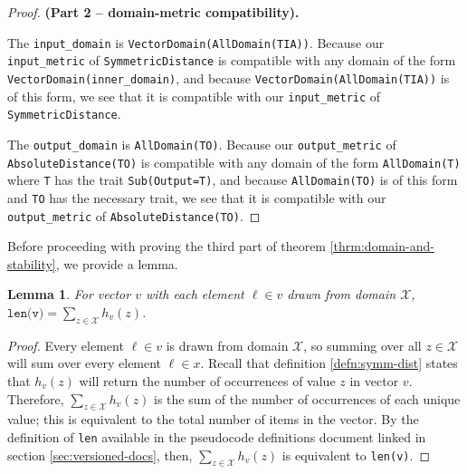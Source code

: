 \documentclass[11pt,letterpaper]{article}
\newtheorem{lemma}[theorem]{Lemma}
\theoremstyle{definition}
\newtheorem{definition}[theorem]{Definition}
\begin{document}
\begin{proof} \textbf{(Part 2 -- domain-metric compatibility).}

The \texttt{input\_domain} is \texttt{VectorDomain(AllDomain(TIA))}. Because our \texttt{input\_metric} of \texttt{SymmetricDistance} is compatible with any domain of the form \\\texttt{VectorDomain(inner\_domain)}, and because \texttt{VectorDomain(AllDomain(TIA))} is of this form, we see that it is compatible with our \texttt{input\_metric} of \texttt{SymmetricDistance}.

The \texttt{output\_domain} is \texttt{AllDomain(TO)}. Because our \texttt{output\_metric} of \texttt{AbsoluteDistance(TO)} is compatible with any domain of the form \texttt{AllDomain(T)} where \texttt{T} has the trait \texttt{Sub(Output=T)}, and because \texttt{AllDomain(TO)} is of this form and \texttt{TO} has the necessary trait, we see that it is compatible with our \texttt{output\_metric} of \texttt{AbsoluteDistance(TO)}.
\end{proof}

Before proceeding with proving the third part of theorem \ref{thrm:domain-and-stability}, we provide a lemma.



\begin{lemma}
\label{lemma:len-sum-equiv}
For vector $v$ with each element $\ell\in v$ drawn from domain $\mathcal{X}$, $\texttt{len(v)} = \sum_{z\in\mathcal{X}} h_v(z)$.
\end{lemma}

\begin{proof}

Every element $\ell \in v$ is drawn from domain $\mathcal{X}$, so summing over all $z\in \mathcal{X}$ will sum over every element $\ell\in x$. Recall that definition \ref{defn:symm-dist} states that $h_v(z)$ will return the number of occurrences of value $z$ in vector $v$. Therefore,  $\sum_{z\in\mathcal{X}} h_v(z)$ is the sum of the number of occurrences of each unique value; this is equivalent to the total number of items in the vector. By the definition of \texttt{len}
 available in the pseudocode definitions document linked in section \ref{sec:versioned-docs}, then, $\sum_{z\in\mathcal{X}} h_v(z)$ is equivalent to \texttt{len(v)}.

\end{proof}
\end{document}
